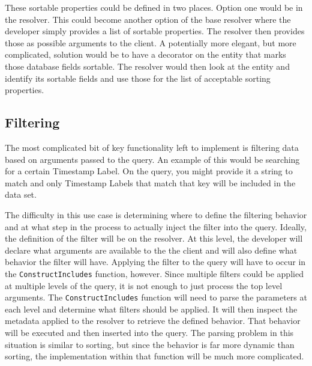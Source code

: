 These sortable properties could be defined in two places.  Option one would be in the resolver.  This could become another option of the base resolver where the developer simply provides a list of sortable properties.  The resolver then provides those as possible arguments to the client.  A potentially more elegant, but more complicated, solution would be to have a decorator on the entity that marks those database fields sortable.  The resolver would then look at the entity and identify its sortable fields and use those for the list of acceptable sorting properties.

\subsection{Filtering}

The most complicated bit of key functionality left to implement is filtering data based on arguments passed to the query.  An example of this would be searching for a certain Timestamp Label.  On the query, you might provide it a string to match and only Timestamp Labels that match that key will be included in the data set.

The difficulty in this use case is determining where to define the filtering behavior and at what step in the process to actually inject the filter into the query.  Ideally, the definition of the filter will be on the resolver. At this level, the developer will declare what arguments are available to the the client and will also define what behavior the filter will have.  Applying the filter to the query will have to occur in the \verb!ConstructIncludes! function, however.  Since multiple filters could be applied at multiple levels of the query, it is not enough to just process the top level arguments.  The \verb!ConstructIncludes! function will need to parse the parameters at each level and determine what filters should be applied.  It will then inspect the metadata applied to the resolver to retrieve the defined behavior.  That behavior will be executed and then inserted into the query.  The parsing problem in this situation is similar to sorting, but since the behavior is far more dynamic than sorting, the implementation within that function will be much more complicated.